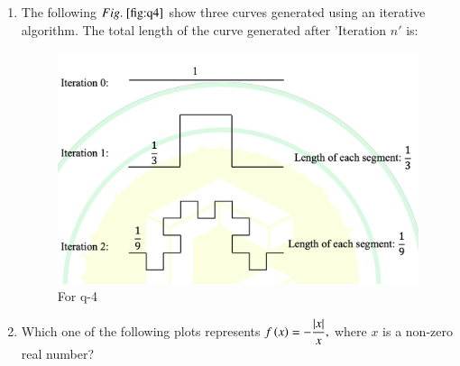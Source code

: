 \documentclass[journal,12pt,onecolumn]{IEEEtran}
\theoremstyle{remark}
\begin{document}
\begin{enumerate}
\begin{enumerate}
\end{enumerate}

\item The following $\figref{fig:q4}$ show three curves generated using an iterative algorithm. The total length of the curve generated after 'Iteration $n'$ is:
\begin{figure}[H]
\centering
\includegraphics[width=0.6\columnwidth]{q4}
\caption{For q-4}
\label{fig:q4}
\end{figure}

\hfill{}

\begin{enumerate}
\end{enumerate}

\item Which one of the following plots represents $f\left(x\right)=-\dfrac{\left\vert x\right\vert}{x},$ where $x$ is a non-zero real number?

\hfill{}


\end{enumerate}
\end{document}
